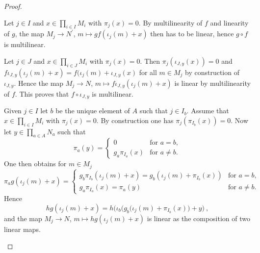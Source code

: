\begin{proof}
  \begin{adromanlist}
  \item
    Let $j\in I$ and $x\in \prod_{i\in I} M_i$ with $\pi_j (x)=0$.
    By multilinearity of $f$ and linearity of $g$, the map $M_j\to N^\prime$,
    $m\mapsto g f (\iota_j(m)+x)$ then has to be linear, hence $g\circ f$ is multilinear.
  \item
    Let $j \in J$ and $x\in \prod_{i\in J} M_i$ with $\pi_j (x)= 0$.
    Then $\pi_j(\iota_{J,y}(x))=0$ and $f \iota_{J,y} (\iota_j(m)+x) =
    f(\iota_j(m) + \iota_{J,y}(x)$ for all $m\in M_j$ by  construction of $\iota_{J,y}$.
    Hence the map $M_j\to N$, $m\mapsto f \iota_{J,y} (\iota_j(m)+x)$ is linear by
    multilinearity of $f$. This proves that $f\circ \iota_{J,y}$ is multilinear.
  \item
    Given $j\in I$ let $b$ be the unique element of $A$  such that $j\in I_b$.
    Assume  that $x\in \prod_{i\in I} M_i$ with $\pi_j (x)=0$.
    By construction one has $\pi_j(\pi_{I_b} (x))=0$.
    Now let $y \in \prod_{a \in A}N_a$ such that
    \[
       \pi_a (y) =
       \begin{cases}
         0 & \text{for } a = b , \\
         g_a \pi_{I_a} (x) & \text{for } a  \neq b.
       \end{cases}
    \]
    One then obtains for $m\in M_j$
    \[
    \pi_a g ( \iota_j(m) + x)= 
    \begin{cases}
      g_b \pi_{I_b} (\iota_j(m)+x) = g_b (\iota_j (m) + \pi_{I_b} (x)) &\text{for }a = b, \\
      g_a \pi_{I_a} (x) =  \pi_a (y)  & \text{for } a  \neq b .
    \end{cases}
    \]
    Hence 
    \[
      h g (\iota_j(m)+ x) =
      h \big( \iota_b \big( g_b ( \iota_j(m) + \pi_{I_b} (x) \big) + y \big) \ ,
    \]
    and the map $M_j\to N$, $m\mapsto h g (\iota_j(m)+ x)$ is linear as the composition of two linear maps. 
  \end{adromanlist}
\end{proof}

